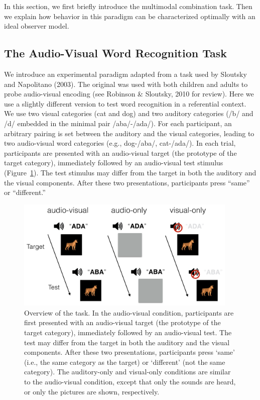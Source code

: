 \documentclass[english,,man,floatsintext]{apa6}
\theoremstyle{definition}
\theoremstyle{definition}
\theoremstyle{definition}
\theoremstyle{remark}
\begin{document}
In this section, we first briefly introduce the multimodal combination
task. Then we explain how behavior in this paradigm can be characterized
optimally with an ideal observer model.

\subsection{The Audio-Visual Word Recognition
Task}\label{the-audio-visual-word-recognition-task}

We introduce an experimental paradigm adapted from a task used by
Sloutsky and Napolitano (2003). The original was used with both children
and adults to probe audio-visual encoding (see Robinson \& Sloutsky,
2010 for review). Here we use a slightly different version to test word
recognition in a referential context. We use two visual categories (cat
and dog) and two auditory categories (/b/ and /d/ embedded in the
minimal pair /aba/-/ada/). For each participant, an arbitrary pairing is
set between the auditory and the visual categories, leading to two
audio-visual word categories (e.g., dog-/aba/, cat-/ada/). In each
trial, participants are presented with an audio-visual target (the
prototype of the target category), immediately followed by an
audio-visual test stimulus (Figure~\ref{fig:task}). The test stimulus
may differ from the target in both the auditory and the visual
components. After these two presentations, participants press
\enquote{same} or \enquote{different.}

\begin{figure}

{\centering \includegraphics[width=400px]{pictures/task} 

}

\caption{Overview of the task. In the audio-visual condition, participants are first presented with an audio-visual target (the prototype of the target category), immediately followed by an audio-visual test. The test may differ from the target in both the auditory and the visual components. After these two presentations, participants press `same' (i.e., the same category as the target) or `different' (not the same category). The auditory-only and visual-only conditions are similar to the audio-visual condition, except that only the sounds are heard, or only the pictures are shown, respectively.}\label{fig:task}
\end{figure}
\end{document}
